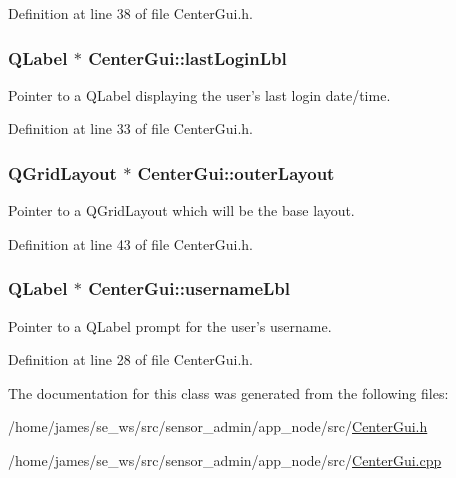 Definition at line 38 of file Center\-Gui.\-h.

\hypertarget{class_center_gui_ad705821fb728b7c2b091c55525963cdf}{
\subsubsection[{last\-Login\-Lbl}]{\setlength{\rightskip}{0pt plus 5cm}Q\-Label $\ast$ Center\-Gui\-::last\-Login\-Lbl\hspace{0.3cm}{\ttfamily [private]}}}\label{class_center_gui_ad705821fb728b7c2b091c55525963cdf}
Pointer to a Q\-Label displaying the user's last login date/time. 

Definition at line 33 of file Center\-Gui.\-h.

\hypertarget{class_center_gui_af7a9e302c0dca4febe804c9a1a9d2dd7}{
\subsubsection[{outer\-Layout}]{\setlength{\rightskip}{0pt plus 5cm}Q\-Grid\-Layout $\ast$ Center\-Gui\-::outer\-Layout\hspace{0.3cm}{\ttfamily [private]}}}\label{class_center_gui_af7a9e302c0dca4febe804c9a1a9d2dd7}
Pointer to a Q\-Grid\-Layout which will be the base layout. 

Definition at line 43 of file Center\-Gui.\-h.

\hypertarget{class_center_gui_a28898f20d373a0a9b78e000d363f1ec8}{
\subsubsection[{username\-Lbl}]{\setlength{\rightskip}{0pt plus 5cm}Q\-Label $\ast$ Center\-Gui\-::username\-Lbl\hspace{0.3cm}{\ttfamily [private]}}}\label{class_center_gui_a28898f20d373a0a9b78e000d363f1ec8}
Pointer to a Q\-Label prompt for the user's username. 

Definition at line 28 of file Center\-Gui.\-h.



The documentation for this class was generated from the following files\-:\begin{DoxyCompactItemize}
\item 
/home/james/se\-\_\-ws/src/sensor\-\_\-admin/app\-\_\-node/src/\hyperlink{app__node_2src_2_center_gui_8h}{Center\-Gui.\-h}\item 
/home/james/se\-\_\-ws/src/sensor\-\_\-admin/app\-\_\-node/src/\hyperlink{app__node_2src_2_center_gui_8cpp}{Center\-Gui.\-cpp}\end{DoxyCompactItemize}
